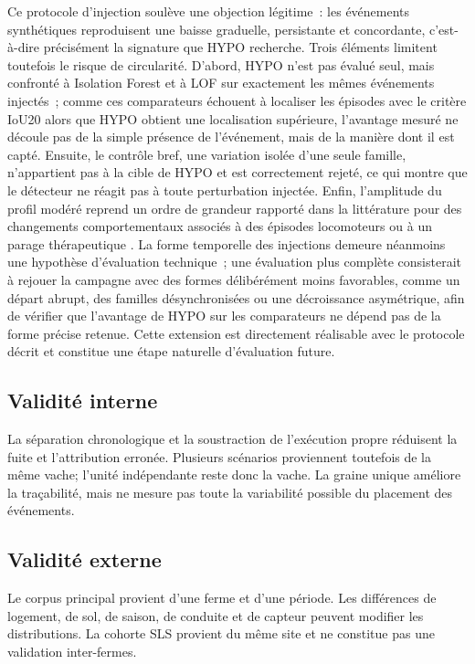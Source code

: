 Ce protocole d'injection soulève une objection légitime~: les événements synthétiques
reproduisent une baisse graduelle, persistante et concordante, c'est-à-dire précisément la
signature que HYPO recherche. Trois éléments limitent toutefois le risque de circularité.
D'abord, HYPO n'est pas évalué seul, mais confronté à Isolation Forest et à LOF sur exactement
les mêmes événements injectés~; comme ces comparateurs échouent à localiser les épisodes avec
le critère IoU20 alors que HYPO obtient une localisation supérieure, l'avantage mesuré ne
découle pas de la simple présence de l'événement, mais de la manière dont il est capté.
Ensuite, le contrôle bref, une variation isolée d'une seule famille, n'appartient pas à la
cible de HYPO et est correctement rejeté, ce qui montre que le détecteur ne réagit pas à toute
perturbation injectée. Enfin, l'amplitude du profil modéré reprend un ordre de grandeur
rapporté dans la littérature pour des changements comportementaux associés à des épisodes
locomoteurs ou à un parage thérapeutique \citep{paudyal2021lying}. La forme temporelle des
injections demeure néanmoins une hypothèse d'évaluation technique~; une évaluation plus
complète consisterait à rejouer la campagne avec des formes délibérément moins favorables,
comme un départ abrupt, des familles désynchronisées ou une décroissance asymétrique, afin de vérifier que
l'avantage de HYPO sur les comparateurs ne dépend pas de la forme précise retenue. Cette
extension est directement réalisable avec le protocole décrit et constitue une étape naturelle
d'évaluation future.

\subsection{Validité interne}
La séparation chronologique et la soustraction de l'exécution propre réduisent la fuite et
l'attribution erronée. Plusieurs scénarios proviennent toutefois de la même vache; l'unité
indépendante reste donc la vache. La graine unique améliore la traçabilité, mais ne mesure pas
toute la variabilité possible du placement des événements.

\subsection{Validité externe}
Le corpus principal provient d'une ferme et d'une période. Les différences de logement, de
sol, de saison, de conduite et de capteur peuvent modifier les distributions. La cohorte SLS
provient du même site et ne constitue pas une validation inter-fermes.

